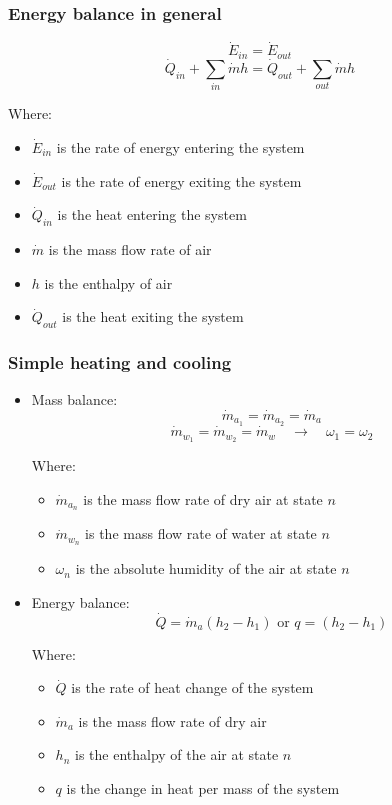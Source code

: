 \documentclass[11pt]{article}
\begin{document}
\subsubsection{Energy balance in general}
\label{sec:org79b014d}
\[\dot{E}_{in} = \dot{E}_{out}\]
\[\dot{Q}_{in} + \sum_{in} \dot{m} h = \dot{Q}_{out} + \sum_{out} \dot{m} h\]

Where:
\begin{itemize}
\item \(\dot{E}_{in}\) is the rate of energy entering the system
\item \(\dot{E}_{out}\) is the rate of energy exiting the system
\item \(\dot{Q}_{in}\) is the heat entering the system
\item \(\dot{m}\) is the mass flow rate of air
\item \(h\) is the enthalpy of air
\item \(\dot{Q}_{out}\) is the heat exiting the system
\end{itemize}

\subsubsection{Simple heating and cooling}
\label{sec:orgfcd43da}
\begin{itemize}
\item Mass balance:
\[\dot{m}_{a_1} = \dot{m}_{a_2} = \dot{m}_a\]
\[\dot{m}_{w_1} = \dot{m}_{w_2} = \dot{m}_w \quad \rightarrow \quad \omega_1 = \omega_2\]

Where:
\begin{itemize}
\item \(\dot{m}_{a_n}\) is the mass flow rate of dry air at state \(n\)
\item \(\dot{m}_{w_n}\) is the mass flow rate of water at state \(n\)
\item \(\omega_n\) is the absolute humidity of the air at state \(n\)
\end{itemize}

\item Energy balance:
\[\dot{Q} = \dot{m}_a (h_2 - h_1) \text{ or } q = (h_2 - h_1)\]

Where:
\begin{itemize}
\item \(\dot{Q}\) is the rate of heat change of the system
\item \(\dot{m}_a\) is the mass flow rate of dry air
\item \(h_n\) is the enthalpy of the air at state \(n\)
\item \(q\) is the change in heat per mass of the system
\end{itemize}
\end{itemize}
\end{document}
